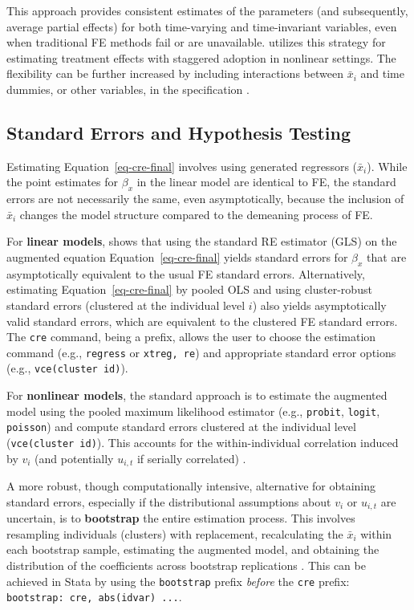 \documentclass[bib]{statapress}
\begin{document}
This approach provides consistent estimates of the parameters (and
subsequently, average partial effects) for both time-varying and
time-invariant variables, even when traditional FE methods fail or are
unavailable. \citet{wooldridge2023} utilizes this strategy for
estimating treatment effects with staggered adoption in nonlinear
settings. The flexibility can be further increased by including
interactions between \(\bar x_i\) and time dummies, or other variables,
in the specification \citep{wooldridge2019}.

\subsection{Standard Errors and Hypothesis Testing}\label{sec-2-3}

Estimating Equation~\ref{eq-cre-final} involves using generated
regressors (\(\bar x_i\)). While the point estimates for \(\beta_x\) in
the linear model are identical to FE, the standard errors are not
necessarily the same, even asymptotically, because the inclusion of
\(\bar x_i\) changes the model structure compared to the demeaning
process of FE.

For \textbf{linear models}, \citet[chap
10.5.3]{wooldridge2010econometric} shows that using the standard RE
estimator (GLS) on the augmented equation Equation~\ref{eq-cre-final}
yields standard errors for \(\beta_x\) that are asymptotically
equivalent to the usual FE standard errors. Alternatively, estimating
Equation~\ref{eq-cre-final} by pooled OLS and using cluster-robust
standard errors (clustered at the individual level \(i\)) also yields
asymptotically valid standard errors, which are equivalent to the
clustered FE standard errors. The \texttt{cre} command, being a prefix,
allows the user to choose the estimation command (e.g., \texttt{regress}
or \texttt{xtreg,\ re}) and appropriate standard error options (e.g.,
\texttt{vce(cluster\ id)}).

For \textbf{nonlinear models}, the standard approach is to estimate the
augmented model using the pooled maximum likelihood estimator (e.g.,
\texttt{probit}, \texttt{logit}, \texttt{poisson}) and compute standard
errors clustered at the individual level (\texttt{vce(cluster\ id)}).
This accounts for the within-individual correlation induced by \(v_i\)
(and potentially \(u_{i,t}\) if serially correlated) \citep[ chap
15.8]{wooldridge2010econometric}.

A more robust, though computationally intensive, alternative for
obtaining standard errors, especially if the distributional assumptions
about \(v_i\) or \(u_{i,t}\) are uncertain, is to \textbf{bootstrap} the
entire estimation process. This involves resampling individuals
(clusters) with replacement, recalculating the \(\bar x_i\) within each
bootstrap sample, estimating the augmented model, and obtaining the
distribution of the coefficients across bootstrap replications \citep[
suggests this]{wooldridge2010econometric}. This can be achieved in Stata
by using the \texttt{bootstrap} prefix \emph{before} the \texttt{cre}
prefix: \texttt{bootstrap:\ cre,\ abs(idvar)\ ...}.
\end{document}
